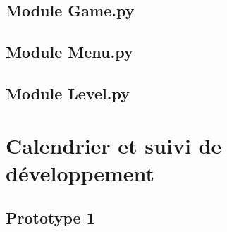 \documentclass[a4paper,11pt]{scrartcl}
\begin{document}
\newpage

\subsection{Module Game.py}

\begin{alltt}

\end{alltt}

\subsection{Module Menu.py}

\begin{alltt}
	
\end{alltt}

\subsection{Module Level.py}
\begin{alltt}
	
\end{alltt}

\section{Calendrier et suivi de développement}
\subsection{Prototype 1}
\end{document}
